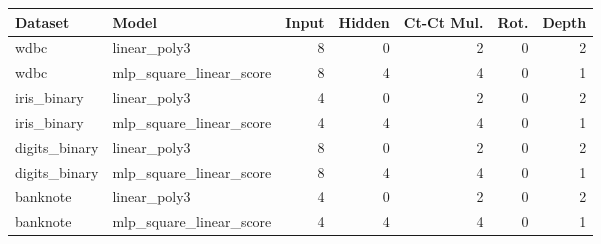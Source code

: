 \begin{tabular}{llrrrrr}
\toprule
Dataset & Model & Input & Hidden & Ct-Ct Mul. & Rot. & Depth \\
\midrule
wdbc & linear\_poly3 & 8 & 0 & 2 & 0 & 2 \\
wdbc & mlp\_square\_linear\_score & 8 & 4 & 4 & 0 & 1 \\
iris\_binary & linear\_poly3 & 4 & 0 & 2 & 0 & 2 \\
iris\_binary & mlp\_square\_linear\_score & 4 & 4 & 4 & 0 & 1 \\
digits\_binary & linear\_poly3 & 8 & 0 & 2 & 0 & 2 \\
digits\_binary & mlp\_square\_linear\_score & 8 & 4 & 4 & 0 & 1 \\
banknote & linear\_poly3 & 4 & 0 & 2 & 0 & 2 \\
banknote & mlp\_square\_linear\_score & 4 & 4 & 4 & 0 & 1 \\
\bottomrule
\end{tabular}
